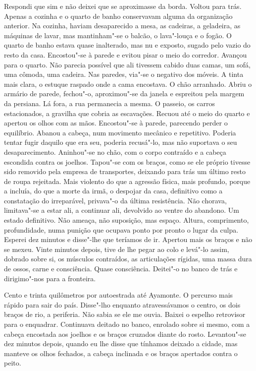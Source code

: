 Respondi que sim e não deixei que se aproximasse da borda. Voltou para
trás. Apenas a cozinha e o quarto de banho conservavam alguma da
organização anterior. Na cozinha, haviam desaparecido a mesa, as
cadeiras, a geladeira, as máquinas de lavar, mas mantinham"-se o
balcão, o lava"-louça e o fogão. O quarto de banho estava quase
inalterado, mas nu e exposto, sugado pelo vazio do resto da casa.
Encostou"-se à parede e evitou pisar o meio do corredor. Avançou para o
quarto. Não parecia possível que ali tivessem cabido duas camas, um
sofá, uma cômoda, uma cadeira. Nas paredes, via"-se o negativo dos
móveis. A tinta mais clara, o estuque raspado onde a cama encostava. O
chão arranhado. Abriu o armário de parede, fechou"-o, aproximou"-se da
janela e espreitou pela margem da persiana. Lá fora, a rua permanecia a
mesma. O passeio, os carros estacionados, a gravilha que cobria as
escavações. Recuou até o meio do quarto e apertou os olhos com as mãos.
Encostou"-se à parede, parecendo perder o equilíbrio. Abanou a cabeça,
num movimento mecânico e repetitivo. Poderia tentar fugir daquilo que
era seu, poderia recusá"-lo, mas não suportava o seu desaparecimento.
Aninhou"-se no chão, com o corpo contraído e a cabeça escondida contra
os joelhos. Tapou"-se com os braços, como se ele próprio tivesse sido
removido pela empresa de transportes, deixando para trás um último resto
de roupa rejeitada. Mais violento do que a agressão física, mais
profundo, porque a incluía, do que a morte da irmã, o despojar da casa,
definitivo como a constatação do irreparável, privava"-o da última
resistência. Não chorava, limitava"-se a estar ali, a continuar ali,
devolvido ao ventre do abandono. Um estado definitivo. Não ameaça, não
suposição, mas espaço. Altura, comprimento, profundidade, numa punição
que ocupava ponto por pronto o lugar da culpa. Esperei dez minutos e
disse"-lhe que teríamos de ir. Apertou mais os braços e não se mexeu.
Vinte minutos depois, tive de lhe pegar ao colo e levá"-lo assim,
dobrado sobre si, os músculos contraídos, as articulações rígidas, uma
massa dura de ossos, carne e consciência. Quase consciência. Deitei"-o
no banco de trás e dirigimo"-nos para a fronteira.

Cento e trinta quilômetros por autoestrada até Ayamonte. O percurso
mais rápido para sair do país. Disse"-lho enquanto atravessávamos o
centro, os dois braços de rio, a periferia. Não sabia se ele me ouvia.
Baixei o espelho retrovisor para o enquadrar. Continuava deitado no
banco, enrolado sobre si mesmo, com a cabeça encostada aos joelhos e os
braços cruzados diante do rosto. Levantou"-se dez minutos depois, quando
eu lhe disse que tínhamos deixado a cidade, mas manteve os olhos
fechados, a cabeça inclinada e os braços apertados contra o peito.

